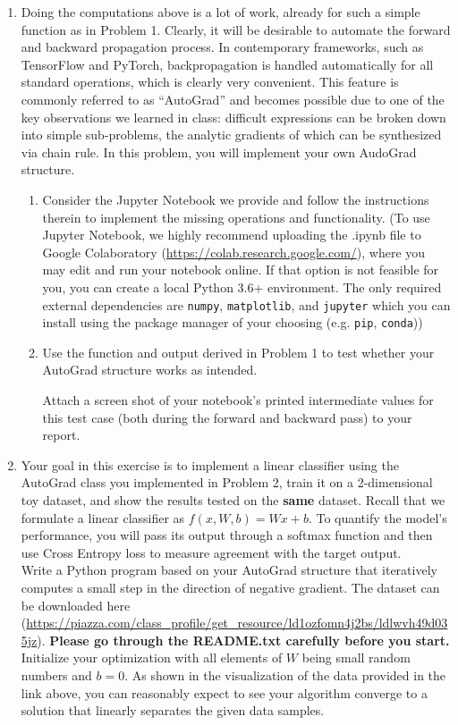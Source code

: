 \documentclass[a4paper]{article}
\begin{document}
\begin{enumerate}
\item Doing the computations above is a lot of work, already for such a simple function as in Problem 1. Clearly, it will be desirable to automate the forward and backward propagation process. In contemporary frameworks, such as TensorFlow and PyTorch, backpropagation is handled automatically for all standard operations, which is clearly very convenient. This feature is commonly referred to as ``AutoGrad'' and becomes possible due to one of the key observations we learned in class: difficult expressions can be broken down into simple sub-problems, the analytic gradients of which can be synthesized via chain rule. In this problem, you will implement your own AudoGrad structure.
    \begin{enumerate}
    \item Consider the Jupyter Notebook we provide and follow the instructions therein to implement the missing operations and functionality. (To use Jupyter Notebook, we highly recommend uploading the .ipynb file to Google Colaboratory (\url{https://colab.research.google.com/}), where you may edit and run your notebook online. If that option is not feasible for you, you can create a local Python 3.6+ environment. The only required external dependencies are \texttt{numpy}, \texttt{matplotlib}, and \texttt{jupyter} which you can install using the package manager of your choosing (e.g. \texttt{pip}, \texttt{conda}))
    \item Use the function and output derived in Problem 1 to test whether your AutoGrad structure works as intended. 
    
    	     Attach a screen shot of your notebook's printed intermediate values for this test case (both during the forward and backward pass) to your report. 
    \end{enumerate}

	
\item 
Your goal in this exercise is to implement a linear classifier using the AutoGrad class you implemented in Problem 2, train it on a 2-dimensional toy dataset, and show the results tested on the {\bf same} dataset.
Recall that we formulate a linear classifier as $f(x, W, b) = Wx + b$. To quantify the model's performance, you will pass its output through a softmax function and then use Cross Entropy loss to measure agreement with the target output.\\

Write a Python program based on your AutoGrad structure that iteratively computes a small step in the direction of negative gradient. The dataset can be downloaded here (\url{https://piazza.com/class_profile/get_resource/ld1ozfomn4j2bs/ldlwvh49d035jz}). {\bf Please go through the README.txt carefully before you start.}
Initialize your optimization with all elements of $W$ being small random numbers and $b=0$. As shown in the visualization of the data provided in the link above, you can reasonably expect to see your algorithm converge to a solution that linearly separates the given data samples.\\


\end{enumerate}
\end{document}
